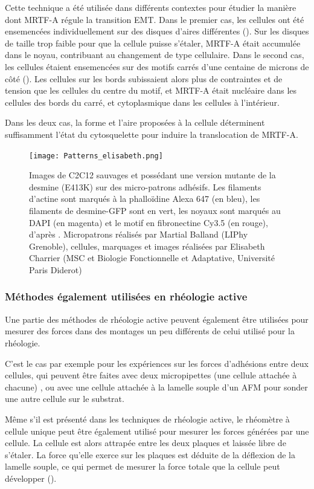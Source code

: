 Cette technique a été utilisée dans différents contextes pour étudier la manière dont MRTF-A régule la transition EMT. 
Dans le premier cas, les cellules ont été ensemencées individuellement sur des disques d'aires différentes (\cite{connelly_actin_2010}). Sur les disques de taille trop faible pour que la cellule puisse s'étaler, MRTF-A était accumulée dans le noyau, contribuant au changement de type cellulaire. 
Dans le second cas, les cellules étaient ensemencées sur des motifs carrés d'une centaine de microns de côté (\cite{gomez_tissue_2010}). Les cellules sur les bords subissaient alors plus de contraintes et de tension que les cellules du centre du motif, et MRTF-A était nucléaire dans les cellules des bords du carré, et cytoplasmique dans les cellules à l'intérieur.

Dans les deux cas, la forme et l'aire proposées à la cellule déterminent suffisamment l'état du cytosquelette pour induire la translocation de MRTF-A.  
\begin{figure}
\texttt{[image: Patterns\_elisabeth.png]}
\caption{Images de C2C12 sauvages et possédant une version mutante de la desmine (E413K) sur des micro-patrons adhésifs. Les filaments d'actine sont marqués à la phalloïdine Alexa 647 (en bleu), les filaments de desmine-GFP sont en vert, les noyaux sont marqués au DAPI (en magenta) et le motif en fibronectine Cy3.5 (en rouge), d'après \cite{charrier_implication_2014}. Micropatrons réalisés par Martial Balland (LIPhy Grenoble), cellules, marquages et images réalisées par Elisabeth Charrier (MSC et Biologie Fonctionnelle et Adaptative, Université Paris Diderot) }
\end{figure}
\subsubsection{Méthodes également utilisées en rhéologie active}

Une partie des méthodes de rhéologie active peuvent également être utilisées pour mesurer des forces dans des montages un peu différents de celui utilisé pour la rhéologie. 

C'est le cas par exemple pour les expériences sur les forces d'adhésions entre deux cellules, qui peuvent être faites avec deux micropipettes (une cellule attachée à chacune) \parencite{biro_dual_2015}, ou avec une cellule attachée à la lamelle souple d'un AFM pour sonder une autre cellule sur le substrat. 

Même s'il est présenté dans les techniques de rhéologie active, le rhéomètre à cellule unique peut être également utilisé pour mesurer les forces générées par une cellule. 
La cellule est alors attrapée entre les deux plaques et laissée libre de s'étaler. La force qu'elle exerce sur les plaques est déduite de la déflexion de la lamelle souple, ce qui permet de mesurer la force totale que la cellule peut développer (\cite{mitrossilis_single-cell_2009}). 

